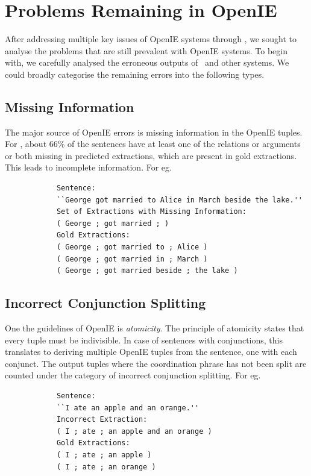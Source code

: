 \section{Problems Remaining in OpenIE}

    After addressing multiple key issues of OpenIE systems through \shortname, we sought to analyse the problems that are still prevalent with OpenIE systems. To begin with, we carefully analysed the erroneous outputs of \shortname\ and other systems. We could broadly categorise the remaining errors into the following types.

    \subsection{Missing Information}
        The major source of OpenIE errors is missing information in the OpenIE tuples. For \shortname, about 66\% of the sentences have at least one of the relations or arguments or both missing in predicted extractions, which are present in gold extractions. This leads to incomplete information. For eg.

        \begin{verbatim}
            Sentence:
            ``George got married to Alice in March beside the lake.''
            Set of Extractions with Missing Information:
            ( George ; got married ; )
            Gold Extractions:
            ( George ; got married to ; Alice )
            ( George ; got married in ; March )
            ( George ; got married beside ; the lake )
        \end{verbatim}

    \subsection{Incorrect Conjunction Splitting}

        One the guidelines of OpenIE is \emph{atomicity}. The principle of atomicity states that every tuple must be indivisible. In case of sentences with conjunctions, this translates to deriving multiple OpenIE tuples from the sentence, one with each conjunct. The output tuples where the coordination phrase has not been split are counted under the category of incorrect conjunction splitting. For eg.

        \begin{verbatim}
            Sentence:
            ``I ate an apple and an orange.''
            Incorrect Extraction:
            ( I ; ate ; an apple and an orange )
            Gold Extractions:
            ( I ; ate ; an apple )
            ( I ; ate ; an orange )
        \end{verbatim}
        
